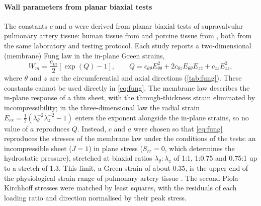 \paragraph{Wall parameters from planar biaxial tests}
The constants $c$ and $a$ were derived from planar biaxial tests of supravalvular pulmonary artery tissue: human tissue from \citet{azadaniRegionalMechanicalProperties2012} and porcine tissue from \citet{matthews2010comparison}, both from the same laboratory and testing protocol.
Each study reports a two-dimensional (membrane) Fung law in the in-plane Green strains,
\begin{equation}
  W_m = \frac{c_m}{2}\left[\exp(Q) - 1\right],
  \qquad
  Q = c_{\theta\theta}E_{\theta\theta}^{2} + 2c_{\theta z}E_{\theta\theta}E_{zz} + c_{zz}E_{zz}^{2},
  \label{eq:fung-membrane}
\end{equation}
where $\theta$ and $z$ are the circumferential and axial directions (\cref{tab:fung}).
These constants cannot be used directly in \cref{eq:fung}.
The membrane law describes the in-plane response of a thin sheet, with the through-thickness strain eliminated by incompressibility; in the three-dimensional law the radial strain $E_{rr} = \tfrac12\left(\lambda_\theta^{-2}\lambda_z^{-2} - 1\right)$ enters the exponent alongside the in-plane strains, so no value of $a$ reproduces $Q$.
Instead, $c$ and $a$ were chosen so that \cref{eq:fung} reproduces the stresses of the membrane law under the conditions of the tests: an incompressible sheet ($J = 1$) in plane stress ($S_{rr} = 0$, which determines the hydrostatic pressure), stretched at biaxial ratios $\lambda_\theta : \lambda_z$ of 1:1, 1:0.75 and 0.75:1 up to a stretch of 1.3.
This limit, a Green strain of about 0.35, is the upper end of the physiological strain range of pulmonary artery tissue \citep{matthews2010comparison}.
The second Piola--Kirchhoff stresses were matched by least squares, with the residuals of each loading ratio and direction normalised by their peak stress.

